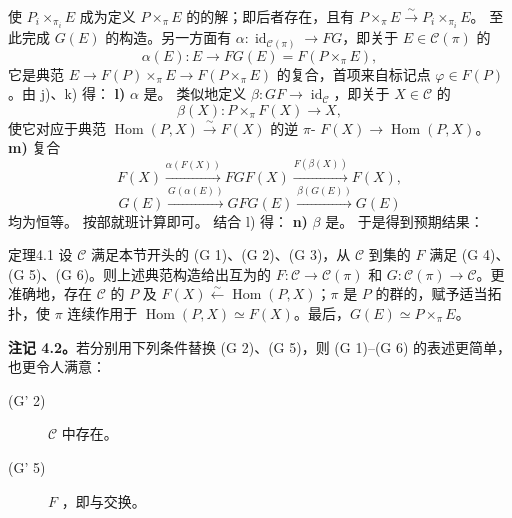 使 $P_i\times_{\pi_i}E$ 成为定义 $P\times_\pi E$ 的的解；即后者存在，且有 $P\times_\pi E\xrightarrow{\sim}P_i\times_{\pi_i}E$。
至此完成 $G(E)$ 的构造。另一方面有 $\alpha:\operatorname{id}_{\mathcal C(\pi)}\to FG$，即关于 $E\in\mathcal C(\pi)$ 的
\[\alpha(E):E\longrightarrow FG(E)=F(P\times_\pi E),\]
它是典范 $E\to F(P)\times_\pi E\to F(P\times_\pi E)$ 的复合，首项来自标记点 $\varphi\in F(P)$。由 j)、k) 得：
\textbf{l)}  $\alpha$ 是。
类似地定义 $\beta:GF\to\operatorname{id}_{\mathcal C}$，即关于 $X\in\mathcal C$ 的
\[\beta(X):P\times_\pi F(X)\longrightarrow X,\]
使它对应于典范 $\operatorname{Hom}(P,X)\xrightarrow{\sim}F(X)$ 的逆 $\pi$- $F(X)\to\operatorname{Hom}(P,X)$。
\textbf{m)} 复合
\[F(X)\xrightarrow{\alpha(F(X))}FGF(X)\xrightarrow{F(\beta(X))}F(X),\]
\[G(E)\xrightarrow{G(\alpha(E))}GFG(E)\xrightarrow{\beta(G(E))}G(E)\]
均为恒等。
按部就班计算即可。
结合 l) 得：
\textbf{n)}  $\beta$ 是。
于是得到预期结果：
\begin{SGAresult}{定理}{4.1}
设 $\mathcal C$ 满足本节开头的 (G 1)、(G 2)、(G 3)，从 $\mathcal C$ 到集的 $F$ 满足 (G 4)、(G 5)、(G 6)。则上述典范构造给出互为的 $F:\mathcal C\to\mathcal C(\pi)$ 和 $G:\mathcal C(\pi)\to\mathcal C$。更准确地，存在 $\mathcal C$ 的 $P$ 及 $F(X)\xleftarrow{\sim}\operatorname{Hom}(P,X)$；$\pi$ 是 $P$ 的群的，赋予适当拓扑，使 $\pi$ 连续作用于 $\operatorname{Hom}(P,X)\simeq F(X)$。最后，$G(E)\simeq P\times_\pi E$。
\end{SGAresult}
\textbf{注记 4.2。}若分别用下列条件替换 (G 2)、(G 5)，则 (G 1)--(G 6) 的表述更简单，也更令人满意：
\begin{description}\item[(G' 2)] $\mathcal C$ 中存在。
\item[(G' 5)] $F$ ，即与交换。
\end{description}
